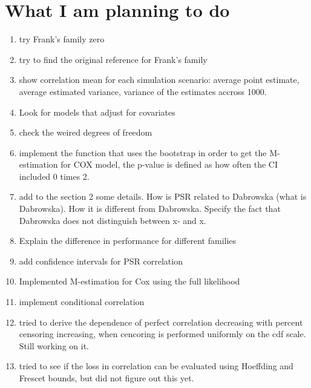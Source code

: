\documentclass[]{article}
\begin{document}
\section{What I am planning to do}
\begin{enumerate}
  \item try Frank's family zero
  \item try to find the original reference for Frank's family
  \item show correlation mean for each simulation scenario: average point estimate, average estimated variance, variance of the estimates accross 1000.
  \item Look for models that adjust for covariates
  \item check the weired degrees of freedom
  \item implement the function that uses the bootstrap in order to get the M-estimation for COX model, the p-value is defined as how often the CI included 0 times 2.
  \item add to the section 2 some details. How is PSR related to Dabrowska (what is Dabrowska). How it is different from Dabrowska. Specify the fact that Dabrowska does not distinguish between x- and x.
  \item Explain the difference in performance for different families
  \item add confidence intervals for PSR correlation
  \item Implemented M-estimation for Cox using the full likelihood
  \item implement conditional correlation
  \item tried to derive the dependence of perfect correlation decreasing with percent censoring increasing, when cencoring is performed uniformly on the cdf scale. Still working on it.
  \item tried to see if the loss in correlation can be evaluated using Hoeffding and Frescet bounds, but did not figure out this yet.
\end{enumerate}
\end{document}
